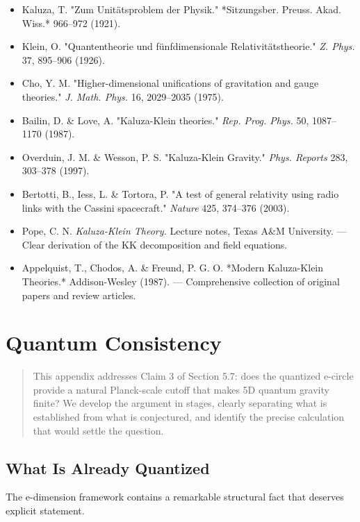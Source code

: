 \documentclass[aps,prd,preprint,superscriptaddress,longbibliography,floatfix]{revtex4-2}
\theoremstyle{remark}
\begin{document}
\begin{itemize}
  \item Kaluza, T. "Zum Unit\"{a}tsproblem der Physik." *Sitzungsber. Preuss. Akad. Wiss.* 966--972 (1921).
  \item Klein, O. "Quantentheorie und f\"{u}nfdimensionale Relativit\"{a}tstheorie." \textit{Z. Phys.} 37, 895--906 (1926).
  \item Cho, Y. M. "Higher-dimensional unifications of gravitation and gauge theories." \textit{J. Math. Phys.} 16, 2029--2035 (1975).
  \item Bailin, D. \& Love, A. "Kaluza-Klein theories." \textit{Rep. Prog. Phys.} 50, 1087--1170 (1987).
  \item Overduin, J. M. \& Wesson, P. S. "Kaluza-Klein Gravity." \textit{Phys. Reports} 283, 303--378 (1997).
  \item Bertotti, B., Iess, L. \& Tortora, P. "A test of general relativity using radio links with the Cassini spacecraft." \textit{Nature} 425, 374--376 (2003).
  \item Pope, C. N. \textit{Kaluza-Klein Theory.} Lecture notes, Texas A\&M University. --- Clear derivation of the KK decomposition and field equations.
  \item Appelquist, T., Chodos, A. \& Freund, P. G. O. *Modern Kaluza-Klein Theories.* Addison-Wesley (1987). --- Comprehensive collection of original papers and review articles.
\end{itemize}


\section{Quantum Consistency}


\begin{quote}
This appendix addresses Claim 3 of Section 5.7: does the quantized e-circle
provide a natural Planck-scale cutoff that makes 5D quantum gravity finite?
We develop the argument in stages, clearly separating what is established
from what is conjectured, and identify the precise calculation that would
settle the question.
\end{quote}



\subsection{What Is Already Quantized}

The e-dimension framework contains a remarkable structural fact that deserves explicit statement.
\end{document}
